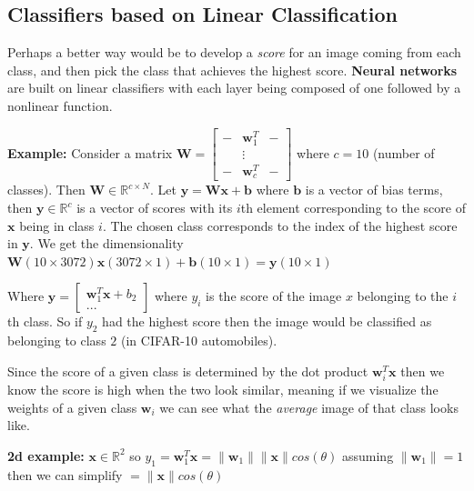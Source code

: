 \documentclass[twocolumn, letter, 10pt, landscape]{article}
\newcommand{\mb}{\mathbf}
\newcommand{\tb}{\textbf}
\newcommand{\ti}{\textit}
\newcommand{\bms}{\begin{bmatrix}}
\newcommand{\bme}{\end{bmatrix}}
\begin{document}
\subsection{Classifiers based on Linear Classification}
Perhaps a better way would be to develop a \ti{score} for an image coming from each class, and then pick the class that achieves the highest score. \tb{Neural networks} are built on linear classifiers with each layer being composed of one followed by a nonlinear function.

\tb{Example:} Consider a matrix $\mb{W} = \bms - & \mb{w}_1^T & -\\ & \vdots \\ - & \mb{w}_c^T & - \bme$ where $c=10$ (number of classes). Then $\mb{W} \in \mathbb{R}^{c\times N}$. Let $\mb{y}=\mb{Wx}+\mb{b}$ where $\mb{b}$ is a vector of bias terms, then $\mb{y}\in \mathbb{R}^c$ is a vector of scores with its $i$th element corresponding to the score of $\mb{x}$ being in class $i$. The chosen class corresponds to the index of the highest score in $\mb{y}$. We get the dimensionality $\mb{W}(10\times 3072)\mb{x}(3072\times 1) + \mb{b}(10\times 1) = \mb{y}(10\times 1)$

Where $\mb{y} = \bms \mb{w}_1^T\mb{x}+b_2 \\ ... \bme$ where $y_i$ is the score of the image $x$ belonging to the $i$th class. So if $y_2$ had the highest score then the image would be classified as belonging to class $2$ (in CIFAR-10 automobiles).

Since the score of a given class is determined by the dot product $\mb{w}_i^T\mb{x}$ then we know the score is high when the two look similar, meaning if we visualize the weights of a given class $\mb{w}_i$ we can see what the \ti{average} image of that class looks like.

\tb{2d example:} $\mb{x}\in\mathbb{R}^2$ so $y_1 = \mb{w}_1^T\mb{x} = \|\mb{w}_1\| \|\mb{x}\| cos(\theta)$ assuming $\|\mb{w}_1\| = 1$ then we can simplify $=\|\mb{x}\|cos(\theta)$
\end{document}
